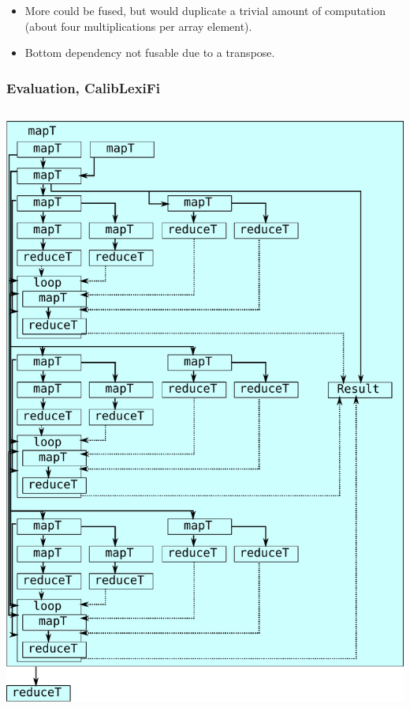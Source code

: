 \documentclass{beamer}
\begin{document}
\begin{frame}
\begin{itemize}
\item More could be fused, but would duplicate a trivial amount of
  computation (about four multiplications per array element).
\item Bottom dependency not fusable due to a transpose.
\end{itemize}

\end{frame}

\begin{frame}
  \frametitle{Evaluation, CalibLexiFi}

\begin{columns}
\begin{column}{0.4\textwidth}
  \includegraphics[width=\textwidth]{img/CalibLexiFi-unfused.pdf}
\end{column}

\end{columns}
\end{frame}
\end{document}
